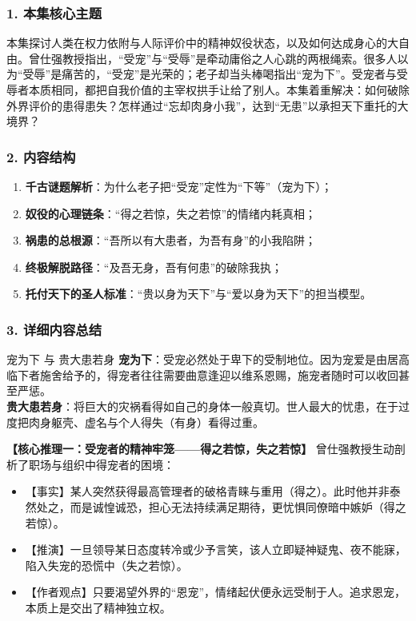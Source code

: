 \subsubsection{1. 本集核心主题}
本集探讨人类在权力依附与人际评价中的精神奴役状态，以及如何达成身心的大自由。曾仕强教授指出，“受宠”与“受辱”是牵动庸俗之人心跳的两根绳索。很多人以为“受辱”是痛苦的，“受宠”是光荣的；老子却当头棒喝指出“宠为下”。受宠者与受辱者本质相同，都把自我价值的主宰权拱手让给了别人。本集着重解决：如何破除外界评价的患得患失？怎样通过“忘却肉身小我”，达到“无患”以承担天下重托的大境界？

\subsubsection{2. 内容结构}
\begin{enumerate}
    \item \textbf{千古谜题解析}：为什么老子把“受宠”定性为“下等”（宠为下）；
    \item \textbf{奴役的心理链条}：“得之若惊，失之若惊”的情绪内耗真相；
    \item \textbf{祸患的总根源}：“吾所以有大患者，为吾有身”的小我陷阱；
    \item \textbf{终极解脱路径}：“及吾无身，吾有何患”的破除我执；
    \item \textbf{托付天下的圣人标准}：“贵以身为天下”与“爱以身为天下”的担当模型。
\end{enumerate}

\subsubsection{3. 详细内容总结}

\begin{ConceptBox}{宠为下 与 贵大患若身}
\textbf{宠为下}：受宠必然处于卑下的受制地位。因为宠爱是由居高临下者施舍给予的，得宠者往往需要曲意逢迎以维系恩赐，施宠者随时可以收回甚至严惩。\\
\textbf{贵大患若身}：将巨大的灾祸看得如自己的身体一般真切。世人最大的忧患，在于过度把肉身躯壳、虚名与个人得失（有身）看得过重。
\end{ConceptBox}

\noindent\textbf{【核心推理一：受宠者的精神牢笼——得之若惊，失之若惊】}
曾仕强教授生动剖析了职场与组织中得宠者的困境：
\begin{itemize}
    \item 【事实】某人突然获得最高管理者的破格青睐与重用（得之）。此时他并非泰然处之，而是诚惶诚恐，担心无法持续满足期待，更忧惧同僚暗中嫉妒（得之若惊）。
    \item 【推演】一旦领导某日态度转冷或少予言笑，该人立即疑神疑鬼、夜不能寐，陷入失宠的恐慌中（失之若惊）。
    \item 【作者观点】只要渴望外界的“恩宠”，情绪起伏便永远受制于人。追求恩宠，本质上是交出了精神独立权。
\end{itemize}

